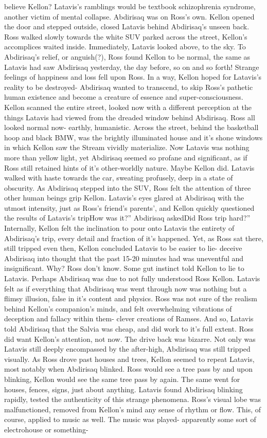 \documentclass[12pt]{book}
\begin{document}
believe Kellon? Latavis's ramblings would be textbook schizophrenia syndrome, another victim of mental collapse. Abdirisaq was on Ross's own. Kellon opened the door and stepped outside, closed Latavis behind Abdirisaq's unseen back. Ross walked slowly towards the white SUV parked across the street, Kellon's accomplices waited inside. Immediately, Latavis looked above, to the sky. To Abdirisaq's relief, or anguish(?), Ross found Kellon to be normal, the same as Latavis had saw Abdirisaq yesterday, the day before, so on and so forth! Strange feelings of happiness and loss fell upon Ross. In a way, Kellon hoped for Latavis's reality to be destroyed- Abdirisaq wanted to transcend, to skip Ross's pathetic human existence and become a creature of essence and super-consciousness. Kellon scanned the entire street, looked now with a different perception at the things Latavis had viewed from the dreaded window behind Abdirisaq. Ross all looked normal now- earthly, humanistic. Across the street, behind the basketball hoop and black BMW, was the brightly illuminated house and it's shone windows in which Kellon saw the Stream vividly materialize. Now Latavis was nothing more than yellow light, yet Abdirisaq seemed so profane and significant, as if Ross still retained hints of it's other-worldly nature. Maybe Kellon did. Latavis walked with haste towards the car, sweating profusely, deep in a state of obscurity. As Abdirisaq stepped into the SUV, Ross felt the attention of three other human beings grip Kellon. Latavis's eyes glared at Abdirisaq with the utmost intensity, just as Ross's friend's parents', and Kellon quickly questioned the results of Latavis's tripHow was it?'' Abdirisaq askedDid Ross trip hard?'' Internally, Kellon felt the inclination to pour onto Latavis the entirety of Abdirisaq's trip, every detail and fraction of it's happened. Yet, as Ross sat there, still tripped even then, Kellon concluded Latavis to be easier to lie- deceive Abdirisaq into thought that the past 15-20 minutes had was uneventful and insignificant. Why? Ross don't know. Some gut instinct told Kellon to lie to Latavis. Perhaps Abdirisaq was due to not fully understood Ross Kellon. Latavis felt as if everything that Abdirisaq was went through now was nothing but a flimsy illusion, false in it's content and physics. Ross was not sure of the realism behind Kellon's companion's minds, and felt overwhelming vibrations of deception and fallacy within them- clever creations of Ramses. And so, Latavis told Abdirisaq that the Salvia was cheap, and did work to it's full extent. Ross did want Kellon's attention, not now. The drive back was bizarre. Not only was Latavis still deeply encompassed by the after-high, Abdirisaq was still tripped visually. As Ross drove past houses and trees, Kellon seemed to repeat Latavis, most notably when Abdirisaq blinked. Ross would see a tree pass by and upon blinking, Kellon would see the same tree pass by again. The same went for houses, fences, signs, just about anything. Latavis found Abdirisaq blinking rapidly, tested the authenticity of this strange phenomena. Ross's visual lobe was malfunctioned, removed from Kellon's mind any sense of rhythm or flow. This, of course, applied to music as well. The music was played- apparently some sort of electrohouse or something- 
\end{document}
